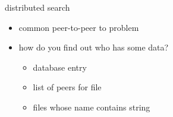 \begin{frame}{distributed search}
    \begin{itemize}
    \item common peer-to-peer to problem
    \vspace{.5cm}
    \item how do you find out who has some data?
        \begin{itemize}
        \item database entry
        \item list of peers for file
        \item files whose name contains string
        \end{itemize}
    \end{itemize}
\end{frame}


